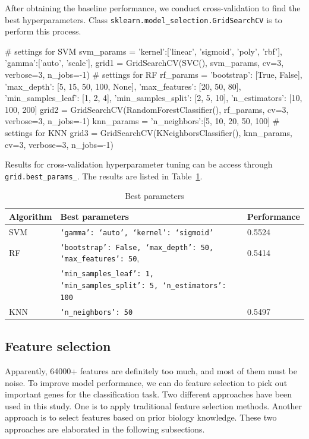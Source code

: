 \documentclass{article}
\begin{document}
After obtaining the baseline performance, we conduct cross-validation to find the best hyperparameters. Class \texttt{sklearn.model\_selection.GridSearchCV} is to perform this process.
\begin{python}
# settings for SVM
svm_params = {
    'kernel':['linear', 'sigmoid', 'poly', 'rbf'],
    'gamma':['auto', 'scale'],
    }
grid1 = GridSearchCV(SVC(), svm_params, cv=3, verbose=3, n_jobs=-1)
# settings for RF
rf_params = {'bootstrap': [True, False],
              'max_depth': [5, 15, 50, 100, None],
              'max_features': [20, 50, 80],
              'min_samples_leaf': [1, 2, 4],
              'min_samples_split': [2, 5, 10],
              'n_estimators': [10, 100, 200]}
grid2 = GridSearchCV(RandomForestClassifier(), rf_params, cv=3, verbose=3, n_jobs=-1)
knn_params = {'n_neighbors':[5, 10, 20, 50, 100]}
# settings for KNN
grid3 = GridSearchCV(KNeighborsClassifier(), knn_params, cv=3, verbose=3, n_jobs=-1)
\end{python}
Results for cross-validation hyperparameter tuning can be access through \texttt{grid.best\_params\_}. The results are listed in Table~\ref{table:params}.
\begin{table}[htbp]
    \centering
    \caption{Best parameters}
    \begin{tabular}{lll}
    \hline
    Algorithm & Best parameters & Performance\\ \hline

    SVM       & \texttt{`gamma': `auto', `kernel': `sigmoid'} & 0.5524\\
    RF        & \texttt{`bootstrap': False, `max\_depth': 50, `max\_features': 50}, & 0.5414 \\
    &\texttt{`min\_samples\_leaf': 1, `min\_samples\_split': 5, `n\_estimators': 100}& \\
    KNN       & \texttt{`n\_neighbors': 50}    & 0.5497 \\ \hline
    \end{tabular}
    \label{table:params}
\end{table}
\subsection{Feature selection}
Apparently, 64000+ features are definitely too much, and most of them must be noise. To improve model performance, we can do feature selection to pick out important genes for the classification task. Two different approaches have been used in this study. One is to apply traditional feature selection methods. Another approach is to select features based on prior biology knowledge. These two approaches are elaborated in the following subsections.
\end{document}
